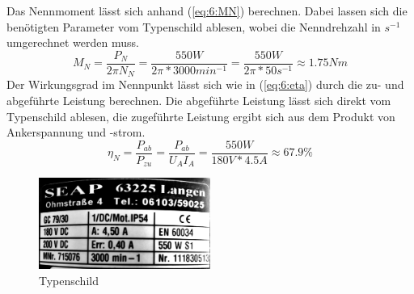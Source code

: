 \chapter{}

\section{}
Das Nennmoment lässt sich anhand (\ref{eq:6:MN}) berechnen. Dabei lassen sich die benötigten Parameter vom Typenschild ablesen, wobei die Nenndrehzahl in $ s^{-1} $ umgerechnet werden muss.
\begin{equation}
	M_{N} = \frac{P_{N}}{2\pi N_{N}} = \frac{550W}{2\pi*3000min^{-1}} = \frac{550W}{2\pi*50s^{-1}} \approx 1.75Nm
	\label{eq:6:MN}
\end{equation}
Der Wirkungsgrad im Nennpunkt lässt sich wie in (\ref{eq:6:eta}) durch die zu- und abgeführte Leistung berechnen. Die abgeführte Leistung lässt sich direkt vom Typenschild ablesen, die zugeführte Leistung ergibt sich aus dem Produkt von Ankerspannung und -strom.
\begin{equation}
	\eta_{N} = \frac{P_{ab}}{P_{zu}} = \frac{P_{ab}}{U_{A}I_{A}} = \frac{550W}{180V*4.5A} \approx 67.9\%
	\label{eq:6:eta}
\end{equation}

\begin{figure}[h]
	\centering
	\includegraphics[width=0.5\textwidth]{./bilder/typenschild.jpg}
	\caption{Typenschild}
	\label{fig:typenschild der Gleichstrommaschine}
\end{figure}